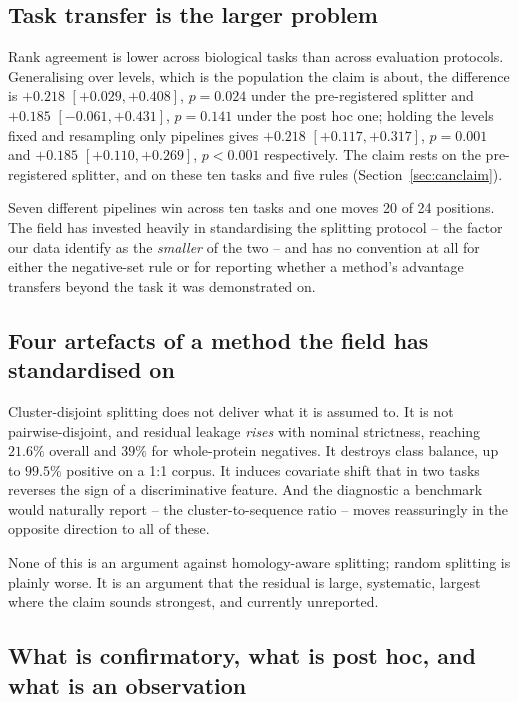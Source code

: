 \documentclass[11pt,a4paper]{article}
\begin{document}
\subsection{Task transfer is the larger problem}

Rank agreement is lower across biological tasks than across evaluation
protocols. Generalising over levels, which is the population the claim is about, the
difference is ${+}0.218$ $[{+}0.029, {+}0.408]$, $p = 0.024$ under the pre-registered
splitter and ${+}0.185$ $[{-}0.061, {+}0.431]$, $p = 0.141$ under the post hoc one; holding
the levels fixed and resampling only pipelines gives ${+}0.218$ $[{+}0.117, {+}0.317]$,
$p = 0.001$ and ${+}0.185$ $[{+}0.110, {+}0.269]$, $p < 0.001$ respectively. The claim
rests on the pre-registered splitter, and on these ten tasks and five rules
(Section~\ref{sec:canclaim}).

Seven different pipelines win across ten tasks and one moves 20 of 24 positions. The field has invested
heavily in standardising the splitting protocol -- the factor our data identify as the
\emph{smaller} of the two -- and has no convention at all for either the negative-set rule
or for reporting whether a method's advantage transfers beyond the task it was demonstrated
on.

\subsection{Four artefacts of a method the field has standardised on}

Cluster-disjoint splitting does not deliver what it is assumed to. It is not
pairwise-disjoint, and residual leakage \emph{rises} with nominal strictness, reaching
$21.6\%$ overall and $39\%$ for whole-protein negatives. It destroys class balance, up to
$99.5\%$ positive on a 1:1 corpus. It induces covariate shift that in two tasks reverses
the sign of a discriminative feature. And the diagnostic a benchmark would naturally
report -- the cluster-to-sequence ratio -- moves reassuringly in the opposite direction to
all of these.

None of this is an argument against homology-aware splitting; random splitting is plainly
worse. It is an argument that the residual is large, systematic, largest where the claim
sounds strongest, and currently unreported.

\subsection{What is confirmatory, what is post hoc, and what is an observation}
\label{sec:status}
\end{document}

